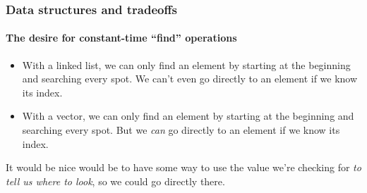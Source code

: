 \documentclass{beamer}
\begin{document}
\begin{frame}
    \frametitle{Data structures and tradeoffs}
    \framesubtitle{The desire for constant-time ``find'' operations}

    \begin{itemize}
        \item With a linked list, we can only find an element by starting at
              the beginning and searching every spot. We can't even go directly to
              an element if we know its index.
        \item With a vector, we can only find an element by starting at the
              beginning and searching every spot. But we \emph{can} go
              directly to an element if we know its index.
    \end{itemize}

    \vspace{1em}

    It would be nice would be to have some way to use the value we're
    checking for \emph{to tell us where to look}, so we could go directly
    there.
\end{frame}
\end{document}
